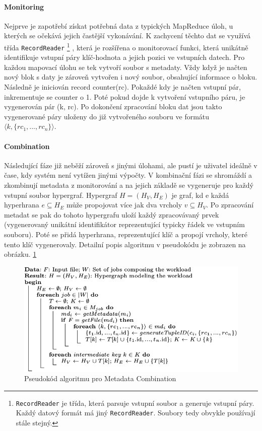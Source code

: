 \documentclass[thesis=M,czech]{FITthesis}[2012/06/26]
\begin{document}
\paragraph{Monitoring}
Nejprve je zapotřebí získat potřebná data z typických MapReduce úloh, u kterých se očekává jejich častější vykonávání. K zachycení těchto dat se využívá třída  \texttt{RecordReader} \footnote{\texttt{RecordReader} je třída, která parsuje vstupní soubor a generuje vstupní páry. Každý datový formát má jiný \texttt{RecordReader}. Soubory tedy obvykle používají stále stejný.} , která je rozšířena o  monitorovací funkci, která unikátně identifikuje vstupní páry klíč-hodnota a jejich pozici ve vstupních datech. Pro každou mapovací úlohu se tek vytvoří soubor s metadaty. Vždy když je načten nový blok s daty je zároveň vytvořen i nový soubor, obsahující informace o bloku. Následně je iniciován record counter(rc). Pokaždé kdy je načten vstupní pár, inkrementuje se counter o 1. Poté pokud dojde k vytvoření vstupního páru, je vygenerován pár (k, rc). Po dokončení zpracování bloku dat jsou takto vygenerované páry uloženy do již vytvořeného souboru ve formátu $\langle k,\{rc_1, ..., rc_n\}\rangle$.
\paragraph{Combination}
Následující fáze již neběží zároveň s jinými úlohami, ale pustí je uživatel ideálně v čase, kdy systém není vytížen jinými výpočty. V kombinační fázi se shromáždí a zkombinují metadata z monitorování a na jejich základě se vygeneruje pro každý vstupní soubor hypergraf. Hypergraf $H = (H_V, H_E)$ je graf, kd
e každá hyperhrana $e \subseteq H_E$ může propojovat více jak dva vrcholy  $v \subseteq H_V$. Po zpracování metadat se pak do tohoto hypergrafu uloží každý zpracovávaný prvek (vygenerovaný unikátní identifikátor reprezentující typicky řádek ve vstupním souboru).  Poté se přidá hyperhrana, reprezentující klíč a propojí vrcholy, které tento klíč vygenerovaly. Detailní popis algoritmu v pseudokódu je zobrazen na obrázku. \ref{fig:alg1}

\begin{figure}\centering
	\includegraphics[width=1\textwidth, angle=0]{files/alg1}
	\caption[Pseudokód algoritmu pro Metadata Combination]
	{Pseudokód algoritmu pro Metadata Combination}\label{fig:alg1}
\end{figure} 
\end{document}
